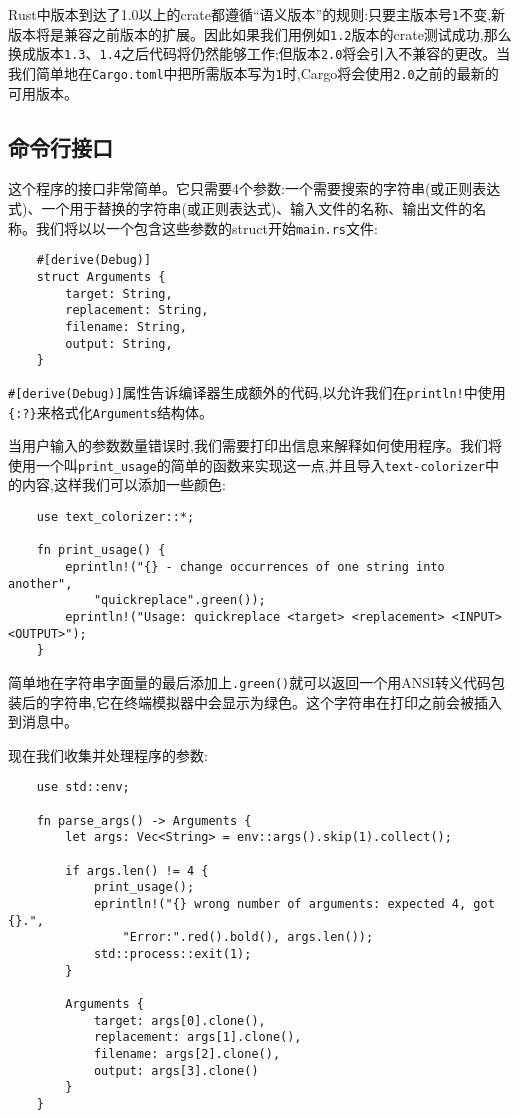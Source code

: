 Rust中版本到达了1.0以上的crate都遵循“语义版本”的规则:只要主版本号\texttt{1}不变,新版本将是兼容之前版本的扩展。因此如果我们用例如\texttt{1.2}版本的crate测试成功,那么换成版本\texttt{1.3}、\texttt{1.4}之后代码将仍然能够工作;但版本\texttt{2.0}将会引入不兼容的更改。当我们简单地在\texttt{Cargo.toml}中把所需版本写为\texttt{1}时,Cargo将会使用\texttt{2.0}之前的最新的可用版本。

\subsection{命令行接口}
这个程序的接口非常简单。它只需要4个参数:一个需要搜索的字符串(或正则表达式)、一个用于替换的字符串(或正则表达式)、输入文件的名称、输出文件的名称。我们将以以一个包含这些参数的struct开始\texttt{main.rs}文件:
\begin{verbatim}
    #[derive(Debug)]
    struct Arguments {
        target: String,
        replacement: String,
        filename: String,
        output: String,
    }
\end{verbatim}

\texttt{\#[derive(Debug)]}属性告诉编译器生成额外的代码,以允许我们在\texttt{println!}中使用\texttt{\{:?\}}来格式化\texttt{Arguments}结构体。

当用户输入的参数数量错误时,我们需要打印出信息来解释如何使用程序。我们将使用一个叫\texttt{print\_usage}的简单的函数来实现这一点,并且导入\texttt{text-colorizer}中的内容,这样我们可以添加一些颜色:
\begin{verbatim}
    use text_colorizer::*;

    fn print_usage() {
        eprintln!("{} - change occurrences of one string into another",
            "quickreplace".green());
        eprintln!("Usage: quickreplace <target> <replacement> <INPUT> <OUTPUT>");
    }
\end{verbatim}

简单地在字符串字面量的最后添加上\texttt{.green()}就可以返回一个用ANSI转义代码包装后的字符串,它在终端模拟器中会显示为绿色。这个字符串在打印之前会被插入到消息中。

现在我们收集并处理程序的参数:
\begin{verbatim}
    use std::env;

    fn parse_args() -> Arguments {
        let args: Vec<String> = env::args().skip(1).collect();

        if args.len() != 4 {
            print_usage();
            eprintln!("{} wrong number of arguments: expected 4, got {}.",
                "Error:".red().bold(), args.len());
            std::process::exit(1);
        }

        Arguments {
            target: args[0].clone(),
            replacement: args[1].clone(),
            filename: args[2].clone(),
            output: args[3].clone()
        }
    }
\end{verbatim}

